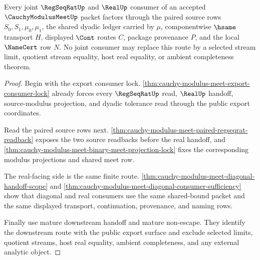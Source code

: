 \begin{theorem}
\label{thm:cauchy-modulus-meet-joint-consumer-exactness}
Every joint $\RegSeqRatUp$ and $\RealUp$ consumer of an accepted $\CauchyModulusMeetUp$ packet factors through the paired source rows $S_0,S_1,\mu_0,\mu_1$, the shared dyadic ledger carried by $\mu$, componentwise $\hsame$ transport $H$, displayed $\Cont$ routes $C$, package provenance $P$, and the local $\NameCert$ row $N$. No joint consumer may replace this route by a selected stream limit, quotient stream equality, host real equality, or ambient completeness theorem.
\end{theorem}
\begin{proof}
Begin with the export consumer lock. \autoref{thm:cauchy-modulus-meet-export-consumer-lock} already forces every $\RegSeqRatUp$ read, $\RealUp$ handoff, source-modulus projection, and dyadic tolerance read through the public export coordinates.

Read the paired source rows next. \autoref{thm:cauchy-modulus-meet-paired-regseqrat-readback} exposes the two source readbacks before the real handoff, and \autoref{thm:cauchy-modulus-meet-binary-meet-projection-lock} fixes the corresponding modulus projections and shared meet row.

The real-facing side is the same finite route. \autoref{thm:cauchy-modulus-meet-diagonal-handoff-scope} and \autoref{thm:cauchy-modulus-meet-diagonal-consumer-sufficiency} show that diagonal and real consumers use the same shared-bound packet and the same displayed transport, continuation, provenance, and naming rows.

Finally use mature downstream handoff and mature non-escape. They identify the downstream route with the public export surface and exclude selected limits, quotient streams, host real equality, ambient completeness, and any external analytic object.
\end{proof}

